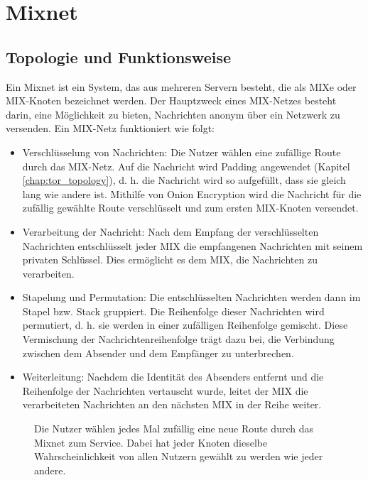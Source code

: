 \section{Mixnet}
\label{chap:mixnet}

\subsection{Topologie und Funktionsweise}
\label{chap:mixnet_topology}

Ein Mixnet ist ein System, das aus mehreren Servern besteht, die als MIXe oder MIX-Knoten bezeichnet werden.  Der Hauptzweck eines MIX-Netzes besteht darin, eine Möglichkeit zu bieten, Nachrichten anonym über ein Netzwerk zu versenden.
Ein MIX-Netz funktioniert wie folgt:

\begin{itemize}
    \item Verschlüsselung von Nachrichten: Die Nutzer wählen eine zufällige Route durch das MIX-Netz. Auf die Nachricht wird Padding angewendet (Kapitel \ref{chap:tor_topology}), d. h. die Nachricht wird so aufgefüllt, dass sie gleich lang wie andere ist. Mithilfe von Onion Encryption wird die Nachricht für die zufällig gewählte Route verschlüsselt und zum ersten MIX-Knoten versendet\cite{OnionEncryptionMixnet}.
    \item Verarbeitung der Nachricht: Nach dem Empfang der verschlüsselten Nachrichten entschlüsselt jeder MIX die empfangenen Nachrichten mit seinem privaten Schlüssel. Dies ermöglicht es dem MIX, die Nachrichten zu verarbeiten.
    \item Stapelung und Permutation: Die entschlüsselten Nachrichten werden dann im Stapel bzw. Stack gruppiert. Die Reihenfolge dieser Nachrichten wird permutiert, d. h. sie werden in einer zufälligen Reihenfolge gemischt. Diese Vermischung der Nachrichtenreihenfolge trägt dazu bei, die Verbindung zwischen dem Absender und dem Empfänger zu unterbrechen.
    \item Weiterleitung: Nachdem die Identität des Absenders entfernt und die Reihenfolge der Nachrichten vertauscht wurde, leitet der MIX die verarbeiteten Nachrichten an den nächsten MIX in der Reihe weiter.
\end{itemize}

\begin{figure}[h!]
    \centering
    
    \caption{Die Nutzer wählen jedes Mal zufällig eine neue Route durch das Mixnet zum Service. Dabei hat jeder Knoten dieselbe Wahrscheinlichkeit von allen Nutzern gewählt zu werden wie jeder andere.}
    \label{imgs:mixnet}
\end{figure}

